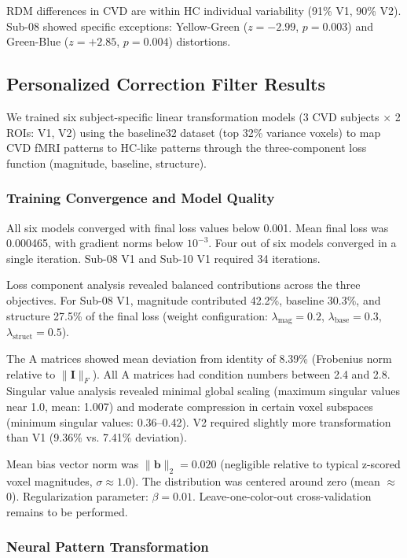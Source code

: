 \documentclass[12pt,a4paper]{article}
\begin{document}
RDM differences in CVD are within HC individual variability (91\% V1, 90\% V2). Sub-08 showed specific exceptions: Yellow-Green ($z = -2.99$, $p = 0.003$) and Green-Blue ($z = +2.85$, $p = 0.004$) distortions.


\subsection{Personalized Correction Filter Results}

We trained six subject-specific linear transformation models (3 CVD subjects × 2 ROIs: V1, V2) using the baseline32 dataset (top 32\% variance voxels) to map CVD fMRI patterns to HC-like patterns through the three-component loss function (magnitude, baseline, structure).

\subsubsection{Training Convergence and Model Quality}

All six models converged with final loss values below 0.001. Mean final loss was 0.000465, with gradient norms below $10^{-3}$. Four out of six models converged in a single iteration. Sub-08 V1 and Sub-10 V1 required 34 iterations.

Loss component analysis revealed balanced contributions across the three objectives. For Sub-08 V1, magnitude contributed 42.2\%, baseline 30.3\%, and structure 27.5\% of the final loss (weight configuration: $\lambda_{\text{mag}}=0.2$, $\lambda_{\text{base}}=0.3$, $\lambda_{\text{struct}}=0.5$).

The A matrices showed mean deviation from identity of 8.39\% (Frobenius norm relative to $\|\mathbf{I}\|_F$). All A matrices had condition numbers between 2.4 and 2.8. Singular value analysis revealed minimal global scaling (maximum singular values near 1.0, mean: 1.007) and moderate compression in certain voxel subspaces (minimum singular values: 0.36--0.42). V2 required slightly more transformation than V1 (9.36\% vs. 7.41\% deviation).

Mean bias vector norm was $\|\mathbf{b}\|_2 = 0.020$ (negligible relative to typical z-scored voxel magnitudes, $\sigma \approx 1.0$). The distribution was centered around zero (mean $\approx$ 0). Regularization parameter: $\beta = 0.01$. Leave-one-color-out cross-validation remains to be performed.

\subsubsection{Neural Pattern Transformation}
\end{document}
